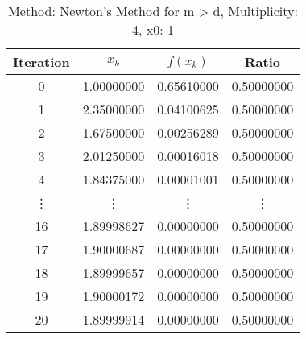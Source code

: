 \begin{table}
\centering
\caption{Method: Newton's Method for m > d, Multiplicity: 4, x0: 1}
\label{tab:table_Newton's_Method_for_m_>_d_4_1}
\begin{tabular}{c c c c}
\toprule
Iteration &      $x_k$ &   $f(x_k)$ &      Ratio \\
\midrule
        0 & 1.00000000 & 0.65610000 & 0.50000000 \\
        1 & 2.35000000 & 0.04100625 & 0.50000000 \\
        2 & 1.67500000 & 0.00256289 & 0.50000000 \\
        3 & 2.01250000 & 0.00016018 & 0.50000000 \\
        4 & 1.84375000 & 0.00001001 & 0.50000000 \\
   \vdots &     \vdots &     \vdots &     \vdots \\
       16 & 1.89998627 & 0.00000000 & 0.50000000 \\
       17 & 1.90000687 & 0.00000000 & 0.50000000 \\
       18 & 1.89999657 & 0.00000000 & 0.50000000 \\
       19 & 1.90000172 & 0.00000000 & 0.50000000 \\
       20 & 1.89999914 & 0.00000000 & 0.50000000 \\
\bottomrule
\end{tabular}
\end{table}
